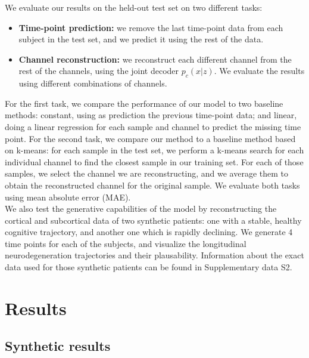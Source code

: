 We evaluate our results on the held-out test set on two different tasks: 

\begin{itemize}
    \item \textbf{Time-point prediction:} we remove the last time-point data from each subject in the test set, and we predict it using the rest of the data. 
    \item \textbf{Channel reconstruction:} we reconstruct each different channel from the rest of the channels, using the joint decoder $p_c(x|z)$. We evaluate the results using different combinations of channels.
\end{itemize}

For the first task, we compare the performance of our model to two baseline methods: constant, using as prediction the previous time-point data; and linear, doing a linear regression for each sample and channel to predict the missing time point. For the second task, we compare our method to a baseline method based on k-means: for each sample in the test set, we perform a k-means search for each individual channel to find the closest sample in our training set. For each of those samples, we select the channel we are reconstructing, and we average them to obtain the reconstructed channel for the original sample. We evaluate both tasks using mean absolute error (MAE). \\

We also test the generative capabilities of the model by reconstructing the cortical and subcortical data of two synthetic patients: one with a stable, healthy cognitive trajectory, and another one which is rapidly declining. We generate 4 time points for each of the subjects, and visualize the longitudinal neurodegeneration trajectories and their plausability. Information about the exact data used for those synthetic patients can be found in Supplementary data S2. \\

\section{Results}
\label{rnn:results}

\subsection{Synthetic results}

